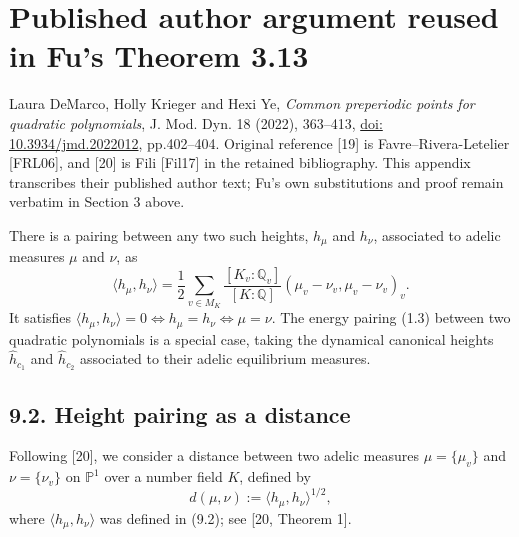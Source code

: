 \documentclass[10pt,a4paper]{amsart}
\numberwithin{equation}{section}
\theoremstyle{plain}
\theoremstyle{definition}
\theoremstyle{remark}
\newcommand{\PP}{\mathbb P}
\newcommand{\Q}{\mathbb Q}
\providecommand{\doi}[1]{\href{https://doi.org/#1}{doi: #1}}
\begin{document}
\section*{Published author argument reused in Fu's Theorem 3.13}
\noindent Laura DeMarco, Holly Krieger and Hexi Ye, \emph{Common preperiodic points for quadratic polynomials}, J. Mod. Dyn. 18 (2022), 363--413, \doi{10.3934/jmd.2022012}, pp.402--404. Original reference [19] is Favre--Rivera-Letelier [FRL06], and [20] is Fili [Fil17] in the retained bibliography. This appendix transcribes their published author text; Fu's own substitutions and proof remain verbatim in Section 3 above.

There is a pairing between any two such heights, $h_{\mu}$ and $h_{\nu}$, associated to adelic measures $\mu$ and $\nu$, as
\begin{equation}
\langle h_{\mu},h_{\nu}\rangle=\frac12\sum_{v\in M_K}\frac{[K_v:\Q_v]}{[K:\Q]}(\mu_v-\nu_v,\mu_v-\nu_v)_v.\tag{9.2}\label{DKY22:eq9.2}
\end{equation}
It satisfies $\langle h_{\mu},h_{\nu}\rangle=0\Longleftrightarrow h_{\mu}=h_{\nu}\Longleftrightarrow\mu=\nu$. The energy pairing (1.3) between two quadratic polynomials is a special case, taking the dynamical canonical heights $\hat h_{c_1}$ and $\hat h_{c_2}$ associated to their adelic equilibrium measures.

\subsection*{9.2. Height pairing as a distance}
Following [20], we consider a distance between two adelic measures $\mu=\{\mu_v\}$ and $\nu=\{\nu_v\}$ on $\PP^1$ over a number field $K$, defined by
\[
d(\mu,\nu):=\langle h_{\mu},h_{\nu}\rangle^{1/2},
\]
where $\langle h_{\mu},h_{\nu}\rangle$ was defined in (9.2); see [20, Theorem 1].
\end{document}
